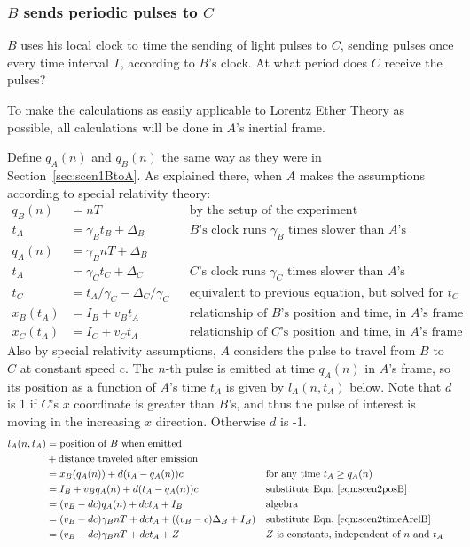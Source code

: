 \documentclass[a4paper]{article}
\theoremstyle{plain}
\theoremstyle{definition}
\begin{document}
\subsubsection{$B$ sends periodic pulses to $C$}
\label{sec:scen2BtoCLETfriendly}

$B$ uses his local clock to time the sending of light pulses to $C$,
sending pulses once every time interval $T$, according to $B$'s clock.
At what period does $C$ receive the pulses?

To make the calculations as easily applicable to Lorentz Ether Theory
as possible, all calculations will be done in $A$'s inertial frame.

Define $q_A(n)$ and $q_B(n)$ the same way as they were in
Section~\ref{sec:scen1BtoA}.  As explained there, when $A$ makes the
assumptions according to special relativity theory:
\begin{align}
q_B(n) & = nT & & \text{by the setup of the experiment} \nonumber \\
t_A & = \gamma_B t_B + \Delta_B & & \text{$B$'s clock runs $\gamma_B$ times slower than $A$'s} \nonumber \\
q_A(n) & = \gamma_B nT + \Delta_B \label{eqn:scen2timeArelB} \\
t_A & = \gamma_C t_C + \Delta_C & & \text{$C$'s clock runs $\gamma_C$ times slower than $A$'s} \nonumber \\
t_C & = t_A/\gamma_C - \Delta_C/\gamma_C & & \text{equivalent to previous equation, but solved for $t_C$} \label{eqn:scen2timeArelC} \\
x_B(t_A) & = I_B + v_B t_A & & \text{relationship of $B$'s position and time, in $A$'s frame} \label{eqn:scen2posB} \\
x_C(t_A) & = I_C + v_C t_A & & \text{relationship of $C$'s position and time, in $A$'s frame} \label{eqn:scen2posC}
\end{align}
Also by special relativity assumptions, $A$ considers the pulse to
travel from $B$ to $C$ at constant speed $c$.
The $n$-th pulse is emitted at time $q_A(n)$ in $A$'s frame,
so its position as a function of $A$'s time $t_A$ is given by
$l_A(n, t_A)$ below.
Note that $d$ is 1 if $C$'s $x$ coordinate is greater than $B$'s, and
thus the pulse of interest is moving in the increasing $x$
direction.  Otherwise $d$ is -1.
\begin{align*}
l_A(n, t_A)
  & = \text{position of $B$ when emitted} \\
  &   + \text{distance traveled after emission} \\
  & = x_B(q_A(n)) + d (t_A - q_A(n)) c & & \text{for any time $t_A \geq q_A(n)$} \\
  & = I_B + v_B q_A(n) + d (t_A - q_A(n)) c & & \text{substitute Eqn.~\eqref{eqn:scen2posB}} \\
  & = (v_B - dc) q_A(n) + dc t_A + I_B & & \text{algebra} \\
  & = (v_B - dc) \gamma_B nT + dc t_A + ((v_B-c)\Delta_B + I_B) & & \text{substitute Eqn.~\eqref{eqn:scen2timeArelB}} \\
  & = (v_B - dc) \gamma_B nT + dc t_A + Z & & \text{$Z$ is constants, independent of $n$ and $t_A$}
\end{align*}
\end{document}
